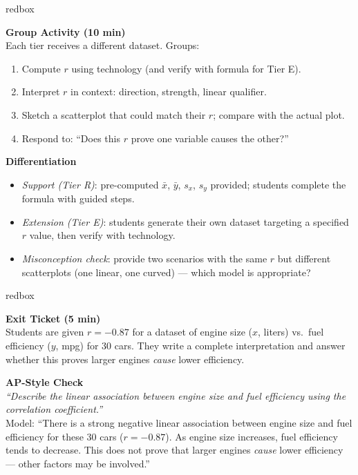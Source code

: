 \documentclass[10pt]{article}
\begin{document}
\begin{skillbox}{redbox}
\begin{minipage}[t]{0.48\linewidth}
    \textbf{Group Activity (10 min)}\\
    Each tier receives a different dataset. Groups:
    \begin{enumerate}
        \item Compute $r$ using technology (and verify with formula for Tier E).
        \item Interpret $r$ in context: direction, strength, linear qualifier.
        \item Sketch a scatterplot that could match their $r$; compare with the actual plot.
        \item Respond to: ``Does this $r$ prove one variable causes the other?''
    \end{enumerate}
\end{minipage}
\hfill
\begin{minipage}[t]{0.48\linewidth}
    \textbf{Differentiation}
    \begin{itemize}
        \item \textit{Support (Tier R)}: pre-computed $\bar x$, $\bar y$, $s_x$, $s_y$ provided;
              students complete the formula with guided steps.
        \item \textit{Extension (Tier E)}: students generate their own dataset targeting
              a specified $r$ value, then verify with technology.
        \item \textit{Misconception check}: provide two scenarios with the same $r$ but
              different scatterplots (one linear, one curved) --- which model is appropriate?
    \end{itemize}
\end{minipage}
\end{skillbox}

\begin{skillbox}{redbox}
\begin{minipage}[t]{0.48\linewidth}
    \textbf{Exit Ticket (5 min)}\\
    Students are given $r = -0.87$ for a dataset of engine size ($x$, liters) vs.\ fuel
    efficiency ($y$, mpg) for 30 cars. They write a complete interpretation and answer
    whether this proves larger engines \emph{cause} lower efficiency.
\end{minipage}
\hfill
\begin{minipage}[t]{0.48\linewidth}
    \textbf{AP-Style Check}\\
    \textit{``Describe the linear association between engine size and fuel efficiency using
    the correlation coefficient.''}\\[4pt]
    Model: ``There is a strong negative linear association between engine size and fuel
    efficiency for these 30 cars ($r = -0.87$). As engine size increases, fuel efficiency
    tends to decrease. This does not prove that larger engines \emph{cause} lower efficiency ---
    other factors may be involved.''
\end{minipage}
\end{skillbox}
\end{document}
